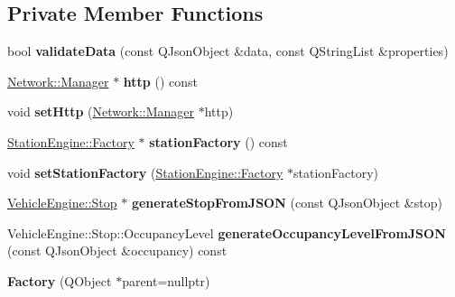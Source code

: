 \subsection*{Private Member Functions}
\begin{DoxyCompactItemize}
\item 
\mbox{\label{classVehicleEngine_1_1Factory_a2e2e49cee65a409309492354de57b496}} 
bool {\bfseries validate\+Data} (const Q\+Json\+Object \&data, const Q\+String\+List \&properties)
\item 
\mbox{\label{classVehicleEngine_1_1Factory_ad9754d9052aad8c82d34ab41988b5d88}} 
\mbox{\hyperlink{classNetwork_1_1Manager}{Network\+::\+Manager}} $\ast$ {\bfseries http} () const
\item 
\mbox{\label{classVehicleEngine_1_1Factory_ac0be65c70dc1288e6897fcdb4d2f4a30}} 
void {\bfseries set\+Http} (\mbox{\hyperlink{classNetwork_1_1Manager}{Network\+::\+Manager}} $\ast$http)
\item 
\mbox{\label{classVehicleEngine_1_1Factory_a8b2dd9ea47df9ed7a62664b6542236fc}} 
\mbox{\hyperlink{classStationEngine_1_1Factory}{Station\+Engine\+::\+Factory}} $\ast$ {\bfseries station\+Factory} () const
\item 
\mbox{\label{classVehicleEngine_1_1Factory_a2fad7421921f211b993c2271b0e8548a}} 
void {\bfseries set\+Station\+Factory} (\mbox{\hyperlink{classStationEngine_1_1Factory}{Station\+Engine\+::\+Factory}} $\ast$station\+Factory)
\item 
\mbox{\label{classVehicleEngine_1_1Factory_a897b4f8f42d0c57a1aabc36d850d16e5}} 
\mbox{\hyperlink{classVehicleEngine_1_1Stop}{Vehicle\+Engine\+::\+Stop}} $\ast$ {\bfseries generate\+Stop\+From\+J\+S\+ON} (const Q\+Json\+Object \&stop)
\item 
\mbox{\label{classVehicleEngine_1_1Factory_abc5d1a7173c2f6be23c68a44d575127e}} 
Vehicle\+Engine\+::\+Stop\+::\+Occupancy\+Level {\bfseries generate\+Occupancy\+Level\+From\+J\+S\+ON} (const Q\+Json\+Object \&occupancy) const
\item 
\mbox{\label{classVehicleEngine_1_1Factory_ac013f1c3e3089e2c8081897c326098c5}} 
{\bfseries Factory} (Q\+Object $\ast$parent=nullptr)
\end{DoxyCompactItemize}
